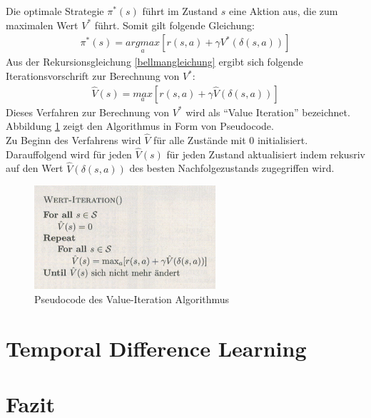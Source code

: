 \documentclass[10pt]{scrartcl}
\begin{document}
Die optimale Strategie $\pi^*(s)$ führt im Zustand $s$ eine Aktion aus, die zum maximalen Wert $V^*$ führt. Somit gilt folgende Gleichung:
\begin{align}
\pi^*(s) = \underset{a}{argmax}[r(s,a) + \gamma V^*(\delta(s,a))]
\end{align}
Aus der Rekursionsgleichung \ref{bellmangleichung} ergibt sich folgende Iterationsvorschrift zur Berechnung von $V^*$:
\begin{align}
\widehat{V}(s) = \underset{a}{max}[r(s,a) + \gamma \widehat{V}(\delta(s,a))]
\end{align}
Dieses Verfahren zur Berechnung von $V^*$ wird als ``Value Iteration'' bezeichnet. 
Abbildung \ref{valueiteration} zeigt den Algorithmus in Form von Pseudocode.\\
Zu Beginn des Verfahrens wird $\widehat{V}$ für alle Zustände mit $0$ initialisiert. Darauffolgend wird für jeden $\widehat{V}(s)$ für jeden Zustand aktualisiert indem rekusriv auf den Wert $\widehat{V}(\delta(s,a))$ des besten Nachfolgezustands zugegriffen wird.

\begin{figure}[htc]
    \centering
    \includegraphics[width=0.6\textwidth]{Grafiken/value-iteration.png}
    \caption{Pseudocode des Value-Iteration Algorithmus}
    \label{valueiteration}
\end{figure}

\section{Temporal Difference Learning}

\section{Fazit}
\end{document}
